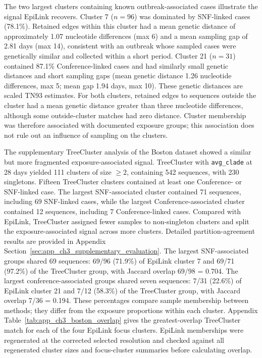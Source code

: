 The two largest clusters containing known outbreak-associated cases illustrate the signal EpiLink recovers. Cluster 7 ($n=96$) was dominated by SNF-linked cases (78.1\%). Retained edges within this cluster had a mean genetic distance of approximately 1.07 nucleotide differences (max 6) and a mean sampling gap of 2.81 days (max 14), consistent with an outbreak whose sampled cases were genetically similar and collected within a short period. Cluster 21 ($n=31$) contained 87.1\% Conference-linked cases and had similarly small genetic distances and short sampling gaps (mean genetic distance 1.26 nucleotide differences, max 5; mean gap 1.94 days, max 10). These genetic distances are scaled TN93 estimates. For both clusters, retained edges to sequences outside the cluster had a mean genetic distance greater than three nucleotide differences, although some outside-cluster matches had zero distance. Cluster membership was therefore associated with documented exposure groups; this association does not rule out an influence of sampling on the clusters.

The supplementary TreeCluster analysis of the Boston dataset showed a similar but more fragmented exposure-associated signal. TreeCluster with \texttt{avg\_clade} at 28 days yielded 111 clusters of size $\ge 2$, containing 542 sequences, with 230 singletons. Fifteen TreeCluster clusters contained at least one Conference- or SNF-linked case. The largest SNF-associated cluster contained 71 sequences, including 69 SNF-linked cases, while the largest Conference-associated cluster contained 12 sequences, including 7 Conference-linked cases. Compared with EpiLink, TreeCluster assigned fewer samples to non-singleton clusters and split the exposure-associated signal across more clusters. Detailed partition-agreement results are provided in Appendix Section~\ref{sec:app_ch3_supplementary_evaluation}. The largest SNF-associated groups shared 69 sequences: 69/96 (71.9\%) of EpiLink cluster 7 and 69/71 (97.2\%) of the TreeCluster group, with Jaccard overlap 69/98 = 0.704. The largest conference-associated groups shared seven sequences: 7/31 (22.6\%) of EpiLink cluster 21 and 7/12 (58.3\%) of the TreeCluster group, with Jaccard overlap 7/36 = 0.194. These percentages compare sample membership between methods; they differ from the exposure proportions within each cluster. Appendix Table~\ref{tab:app_ch3_boston_overlap} gives the greatest-overlap TreeCluster match for each of the four EpiLink focus clusters. EpiLink memberships were regenerated at the corrected selected resolution and checked against all regenerated cluster sizes and focus-cluster summaries before calculating overlap.


